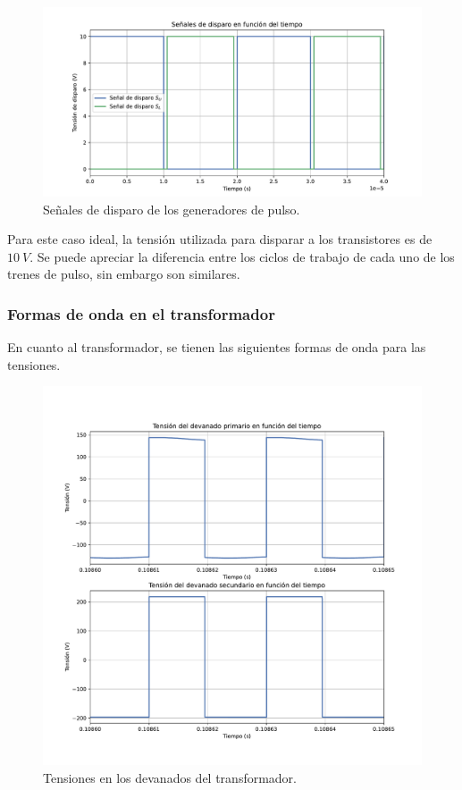 \begin{figure}
	\centering
	\includegraphics[width=1\linewidth]{../disparo}
	\caption{Señales de disparo de los generadores de pulso.}
	\label{fig:disparo}
\end{figure}

Para este caso ideal, la tensión utilizada para disparar a los transistores es de $10 \ V$. Se puede apreciar la diferencia entre los ciclos de trabajo de cada uno de los trenes de pulso, sin embargo son similares.

\subsubsection{Formas de onda en el transformador}

En cuanto al transformador, se tienen las siguientes formas de onda para las tensiones.

\begin{figure}
	\centering
	\includegraphics[width=1\linewidth]{../tensiones_transformador}
	\caption{Tensiones en los devanados del transformador.}
	\label{fig:tensionestransformador}
\end{figure}


